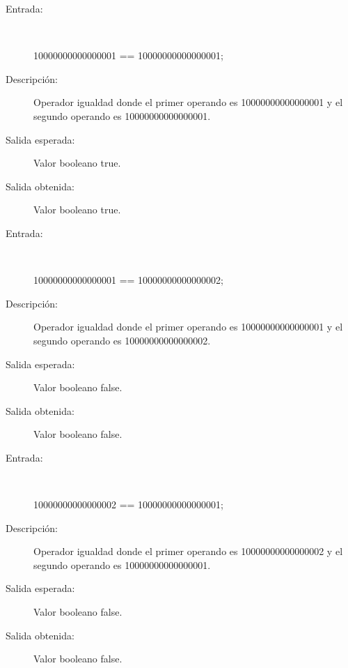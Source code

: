 	\begin{description}
		\item [Entrada:] \hfill \\
\begin{myverbatim}
 10000000000000001 == 10000000000000001;
\end{myverbatim}
		\item [Descripción:] Operador igualdad donde el primer operando es 10000000000000001 y el segundo operando es  10000000000000001.
		\item [Salida esperada:] Valor booleano true.
		\item [Salida obtenida:] Valor booleano true.
	\end{description}

	\begin{description}
		\item [Entrada:] \hfill \\
\begin{myverbatim}
 10000000000000001 == 10000000000000002;
\end{myverbatim}
		\item [Descripción:] Operador igualdad donde el primer operando es 10000000000000001 y el segundo operando es  10000000000000002.
		\item [Salida esperada:] Valor booleano false.
		\item [Salida obtenida:] Valor booleano false.
	\end{description}

	\begin{description}
		\item [Entrada:] \hfill \\
\begin{myverbatim}
 10000000000000002 == 10000000000000001;
\end{myverbatim}
		\item [Descripción:] Operador igualdad donde el primer operando es 10000000000000002 y el segundo operando es  10000000000000001.
		\item [Salida esperada:] Valor booleano false.
		\item [Salida obtenida:] Valor booleano false.
	\end{description}

